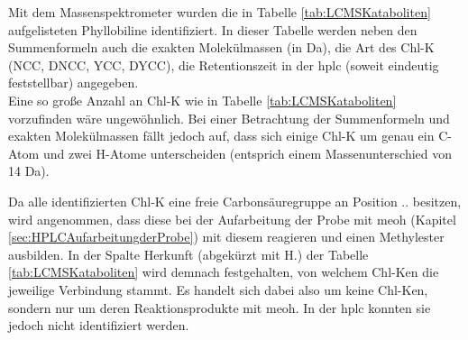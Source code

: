 Mit dem Massenspektrometer wurden die in Tabelle \ref{tab:LCMSKataboliten} aufgelisteten Phyllobiline identifiziert. In dieser Tabelle werden neben den Summenformeln auch die exakten Molekülmassen (in Da), die Art des \gls{Chl-K} (NCC, DNCC, YCC, DYCC), die Retentionszeit in der \gls{hplc} (soweit eindeutig feststellbar) angegeben. \\

Eine so große Anzahl an \gls{Chl-K} wie in Tabelle \ref{tab:LCMSKataboliten} vorzufinden wäre ungewöhnlich. Bei einer Betrachtung der Summenformeln und exakten Molekülmassen fällt jedoch auf, dass sich einige \gls{Chl-K} um genau ein C-Atom und zwei H-Atome unterscheiden (entsprich einem Massenunterschied von 14 Da). 

Da alle identifizierten \gls{Chl-K} eine freie Carbonsäuregruppe an Position .. besitzen, wird angenommen, dass diese bei der Aufarbeitung der Probe mit \gls{meoh} (Kapitel \ref{sec:HPLCAufarbeitungderProbe}) mit diesem reagieren und einen Methylester ausbilden. In der Spalte Herkunft (abgekürzt mit H.) der Tabelle \ref{tab:LCMSKataboliten} wird demnach festgehalten, von welchem \gls{Chl-K}en die jeweilige Verbindung stammt. Es handelt sich dabei also um keine \gls{Chl-K}en, sondern nur um deren Reaktionsprodukte mit \gls{meoh}. In der \gls{hplc} konnten sie jedoch nicht identifiziert werden. \\

